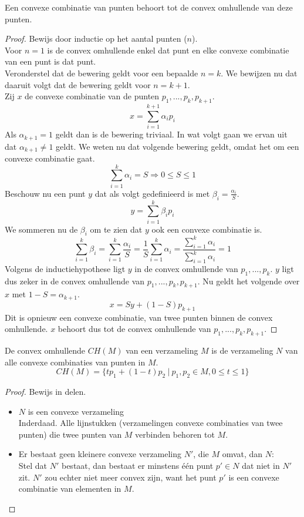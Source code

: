 \documentclass[computergesteund_ontwerp_van_curven_en_oppervlakken.tex]{subfiles}
\begin{document}
\begin{st}
Een convexe combinatie van punten behoort tot de convex omhullende van deze punten.
\begin{proof}
Bewijs door inductie op het aantal punten ($n$).\\
Voor $n=1$ is de convex omhullende enkel dat punt en elke convexe combinatie van een punt is dat punt.\\
Veronderstel dat de bewering geldt voor een bepaalde $n=k$. We bewijzen nu dat daaruit volgt dat de bewering geldt voor $n=k+1$.\\
Zij $x$ de convexe combinatie van de punten $p_1,...,p_k,p_{k+1}$.
\[
x = \sum_{i=1}^{k+1}\alpha_ip_i
\]
Als $\alpha_{k+1} = 1$ geldt dan is de bewering triviaal. In wat volgt gaan we ervan uit dat $\alpha_{k+1} \neq 1$ geldt.
We weten nu dat volgende bewering geldt, omdat het om een convexe combinatie gaat.
\[
\sum_{i=1}^{k}\alpha_i = S \Rightarrow 0 \le S \le 1
\]
Beschouw nu een punt $y$ dat als volgt gedefinieerd is met $\beta_i = \frac{\alpha_i}{S}$.
\[
y = \sum_{i=1}^k\beta_{i}p_{i}
\]
We sommeren nu de $\beta_i$ om te zien dat $y$ ook een convexe combinatie is.
\[
\sum_{i=1}^k\beta_{i} = \sum_{i=1}^k \frac{\alpha_i}{S} = \frac{1}{S}\sum_{i=1}^k \alpha_i = \frac{\sum_{i=1}^{k}\alpha_i}{\sum_{i=1}^{k}\alpha_i} = 1
\]
Volgens de inductiehypothese ligt $y$ in de convex omhullende van $p_1,...,p_k$. $y$ ligt dus zeker in de convex omhullende van $p_1,...,p_k,p_{k+1}$. Nu geldt het volgende over $x$ met $1-S = \alpha_{k+1}$.
\[
x = Sy + (1-S)p_{k+1}
\]
Dit is opnieuw een convexe combinatie, van twee punten binnen de convex omhullende. $x$ behoort dus tot de convex omhullende van $p_1,...,p_k,p_{k+1}$. 
\end{proof}
\end{st}
\begin{st}
De convex omhullende $CH(M)$ van een verzameling $M$ is de verzameling $N$ van alle convexe combinaties van punten in $M$.
\[
CH(M) = \{ tp_1 + (1-t)p_2\ |\ p_1,p_2 \in M, 0\le t \le 1\}
\]
\begin{proof} Bewijs in delen.
\begin{itemize}
\item $N$ is een convexe verzameling\\ Inderdaad. Alle lijnstukken (verzamelingen convexe combinaties van twee punten)  die twee punten van $M$ verbinden behoren tot $M$.
\item Er bestaat geen kleinere convexe verzameling $N'$, die $M$ omvat, dan $N$:\\
Stel dat $N'$ bestaat, dan bestaat er minstens \'e\'en punt $p' \in N$ dat niet in $N'$ zit. $N'$ zou echter niet meer convex zijn, want het punt $p'$ is een convexe combinatie van elementen in $M$.
\end{itemize}
\end{proof}
\end{st}
\end{document}
